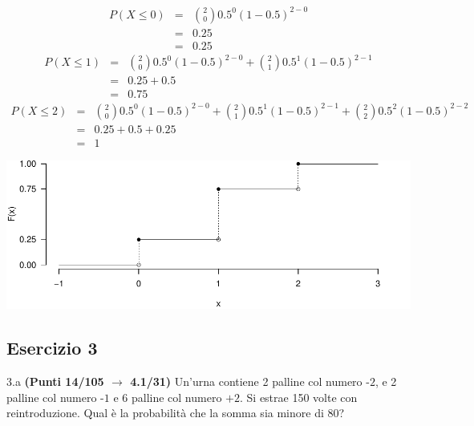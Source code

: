 \documentclass[
  11pt,
]{book}
\theoremstyle{mytheoremstyle}
\theoremstyle{mydefstyle}
\newenvironment{sol}
  {
  \begin{tcolorbox}[enhanced,breakable,arc=0.1mm,boxrule=1pt,colback=white,colframe=iblue,
  title=\bf \fontfamily{lmss}\selectfont \hspace{.5 cm} Soluzione,drop fuzzy shadow]

}{
\end{tcolorbox}
  }
\begin{document}
\begin{sol}

\normalsize 
\begin{eqnarray*}
      P( X \leq 0 ) &=& \binom{ 2 }{ 0 } 0.5 ^{ 0 }(1- 0.5 )^{ 2 - 0 } \\                 &=& 0.25 \\                 &=& 0.25 
   \end{eqnarray*}
\normalsize  \normalsize 
\begin{eqnarray*}
      P( X \leq 1 ) &=& \binom{ 2 }{ 0 } 0.5 ^{ 0 }(1- 0.5 )^{ 2 - 0 }+\binom{ 2 }{ 1 } 0.5 ^{ 1 }(1- 0.5 )^{ 2 - 1 } \\                 &=& 0.25+0.5 \\                 &=& 0.75 
   \end{eqnarray*}
\normalsize  \normalsize 
\begin{eqnarray*}
      P( X \leq 2 ) &=& \binom{ 2 }{ 0 } 0.5 ^{ 0 }(1- 0.5 )^{ 2 - 0 }+\binom{ 2 }{ 1 } 0.5 ^{ 1 }(1- 0.5 )^{ 2 - 1 }+\binom{ 2 }{ 2 } 0.5 ^{ 2 }(1- 0.5 )^{ 2 - 2 } \\                 &=& 0.25+0.5+0.25 \\                 &=& 1 
   \end{eqnarray*}
\normalsize 

\begin{center}\includegraphics{Esami_passati_con_soluzioni_files/figure-latex/2024-126-1} \end{center}

\end{sol}

\subsection{Esercizio 3}\label{esercizio-3-41}

3.a \textbf{(Punti 14/105 \(\rightarrow\) 4.1/31)} Un'urna contiene 2 palline col numero \(\mbox{-2}\), e 2 palline col numero \(\mbox{-1}\) e 6 palline col numero \(\mbox{+2}\).
Si estrae 150 volte con reintroduzione.
Qual è la probabilità che la somma sia minore di 80?
\end{document}
